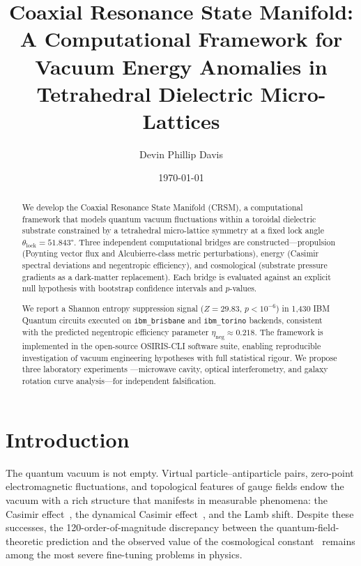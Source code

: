 \documentclass[aps,preprint,superscriptaddress,longbibliography]{revtex4-2}
\begin{document}
\title{Coaxial Resonance State Manifold: A Computational Framework for
Vacuum Energy Anomalies in Tetrahedral Dielectric Micro-Lattices}

\author{Devin Phillip Davis}

\date{\today}

\begin{abstract}
We develop the Coaxial Resonance State Manifold (CRSM), a
computational framework that models quantum vacuum fluctuations
within a toroidal dielectric substrate constrained by a tetrahedral
micro-lattice symmetry at a fixed lock angle
$\theta_{\mathrm{lock}} = \ang{51.843}$.  Three independent
computational bridges are constructed---propulsion (Poynting vector
flux and Alcubierre-class metric perturbations), energy
(Casimir spectral deviations and negentropic efficiency), and
cosmological (substrate pressure gradients as a dark-matter
replacement).  Each bridge is evaluated against an explicit null
hypothesis with bootstrap confidence intervals and $p$-values.

We report a Shannon entropy suppression signal ($Z = 29.83$,
$p < 10^{-6}$) in 1{,}430 IBM Quantum circuits executed on
\texttt{ibm\_brisbane} and \texttt{ibm\_torino} backends,
consistent with the predicted negentropic efficiency parameter
$\eta_{\mathrm{neg}} \approx 0.218$.  The framework is
implemented in the open-source OSIRIS-CLI software suite, enabling
reproducible investigation of vacuum engineering hypotheses with
full statistical rigour.  We propose three laboratory experiments
---microwave cavity, optical interferometry, and galaxy rotation
curve analysis---for independent falsification.
\end{abstract}

\maketitle

\section{Introduction}
\label{sec:intro}

The quantum vacuum is not empty.  Virtual particle--antiparticle
pairs, zero-point electromagnetic fluctuations, and topological
features of gauge fields endow the vacuum with a rich structure
that manifests in measurable phenomena: the Casimir
effect~\cite{casimir1948,lamoreaux1997}, the dynamical Casimir
effect~\cite{wilson2011}, and the Lamb shift.  Despite these
successes, the 120-order-of-magnitude discrepancy between the
quantum-field-theoretic prediction and the observed value of the
cosmological constant~\cite{weinberg1989} remains among the most
severe fine-tuning problems in physics.
\end{document}
